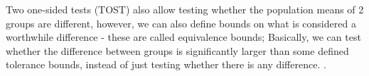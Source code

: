 Two one-sided tests (TOST) also allow testing whether the population means of 2 groups are different, however, we can also define bounds on what is considered a worthwhile difference - these are called equivalence bounds; Basically, we can test whether the difference between groups is significantly larger than some defined tolerance bounds, instead of just testing whether there is any difference. \cite{tost}.
